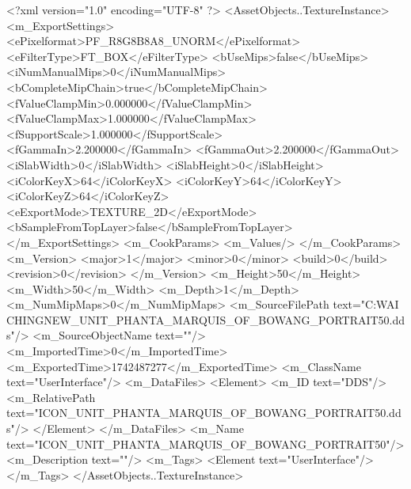 <?xml version="1.0" encoding="UTF-8" ?>
<AssetObjects..TextureInstance>
	<m_ExportSettings>
		<ePixelformat>PF_R8G8B8A8_UNORM</ePixelformat>
		<eFilterType>FT_BOX</eFilterType>
		<bUseMips>false</bUseMips>
		<iNumManualMips>0</iNumManualMips>
		<bCompleteMipChain>true</bCompleteMipChain>
		<fValueClampMin>0.000000</fValueClampMin>
		<fValueClampMax>1.000000</fValueClampMax>
		<fSupportScale>1.000000</fSupportScale>
		<fGammaIn>2.200000</fGammaIn>
		<fGammaOut>2.200000</fGammaOut>
		<iSlabWidth>0</iSlabWidth>
		<iSlabHeight>0</iSlabHeight>
		<iColorKeyX>64</iColorKeyX>
		<iColorKeyY>64</iColorKeyY>
		<iColorKeyZ>64</iColorKeyZ>
		<eExportMode>TEXTURE_2D</eExportMode>
		<bSampleFromTopLayer>false</bSampleFromTopLayer>
	</m_ExportSettings>
	<m_CookParams>
		<m_Values/>
	</m_CookParams>
	<m_Version>
		<major>1</major>
		<minor>0</minor>
		<build>0</build>
		<revision>0</revision>
	</m_Version>
	<m_Height>50</m_Height>
	<m_Width>50</m_Width>
	<m_Depth>1</m_Depth>
	<m_NumMipMaps>0</m_NumMipMaps>
	<m_SourceFilePath text="C:\Users\YANG WAI CHING\Downloads\CIV\DDS NEW\ICON_UNIT_PHANTA_MARQUIS_OF_BOWANG_PORTRAIT50.dds"/>
	<m_SourceObjectName text=""/>
	<m_ImportedTime>0</m_ImportedTime>
	<m_ExportedTime>1742487277</m_ExportedTime>
	<m_ClassName text="UserInterface"/>
	<m_DataFiles>
		<Element>
			<m_ID text="DDS"/>
			<m_RelativePath text="ICON_UNIT_PHANTA_MARQUIS_OF_BOWANG_PORTRAIT50.dds"/>
		</Element>
	</m_DataFiles>
	<m_Name text="ICON_UNIT_PHANTA_MARQUIS_OF_BOWANG_PORTRAIT50"/>
	<m_Description text=""/>
	<m_Tags>
		<Element text="UserInterface"/>
	</m_Tags>
</AssetObjects..TextureInstance>

